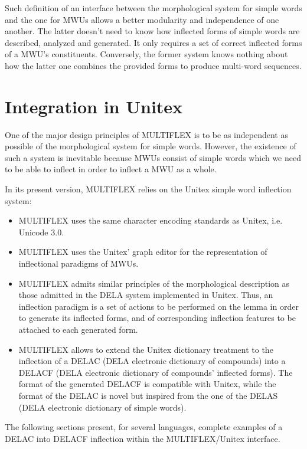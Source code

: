 \bigskip
\noindent Such definition of an interface between the morphological system for simple words and 
the one for MWUs allows a better modularity and independence of one another. The latter doesn't 
need to know how inflected forms of simple words are described, analyzed and generated. It only 
requires a set of correct inflected forms of a MWU's constituents. Conversely, the former system 
knows nothing about how the latter one combines the provided forms to produce multi-word sequences.        
 
\section{Integration in Unitex}
\label{section:UNITEXinterface}
One of the major design principles of MULTIFLEX is to be as independent as possible of the 
morphological system for simple words. However, the existence of such a system is inevitable 
because MWUs consist of simple words which we need to be able to inflect in order to inflect 
a MWU as a whole.

\bigskip
\noindent In its present version, MULTIFLEX relies on the Unitex simple
word inflection system:

\begin{itemize}
\item MULTIFLEX uses the same character encoding standards as Unitex, i.e. Unicode 3.0.
\item MULTIFLEX uses the Unitex' graph editor for the representation of inflectional paradigms of MWUs.
\item MULTIFLEX admits similar principles of the morphological description as those admitted in 
the DELA system implemented in Unitex. Thus, an inflection paradigm is a set 
of actions to be performed on the lemma in order to generate its inflected forms, and of 
corresponding inflection features to be attached to each generated form.
\item MULTIFLEX allows to extend the Unitex dictionary treatment to the inflection of a DELAC 
(DELA electronic dictionary of compounds) into a DELACF (DELA electronic dictionary of 
compounds' inflected forms). The format of the generated DELACF is compatible with Unitex, 
while the format of the DELAC is novel but inspired from the one of the DELAS (DELA electronic 
dictionary of simple words).
\end{itemize}

\bigskip
\noindent The following sections present, for several languages, complete examples of a DELAC into DELACF 
inflection within the MULTIFLEX/Unitex interface.

